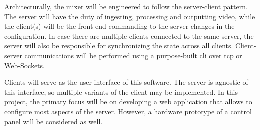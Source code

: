 \documentclass[../main.tex]{subfiles}
\begin{document}
Architecturally, the mixer will be engineered to follow the server-client pattern. The server will have the duty of ingesting, processing and outputting video, while the client(s) will be the front-end commanding to the server changes in the configuration. In case there are multiple clients connected to the same server, the server will also be responsible for synchronizing the state across all clients. Client-server communications will be performed using a purpose-built \gls{cli} over \gls{tcp} or Web-Sockets.\newline

Clients will serve as the user interface of this software. The server is agnostic of this interface, so multiple variants of the client may be implemented. In this project, the primary focus will be on developing a web application that allows to configure most aspects of the server. However, a hardware prototype of a control panel will be considered as well.\newline

\end{document}
